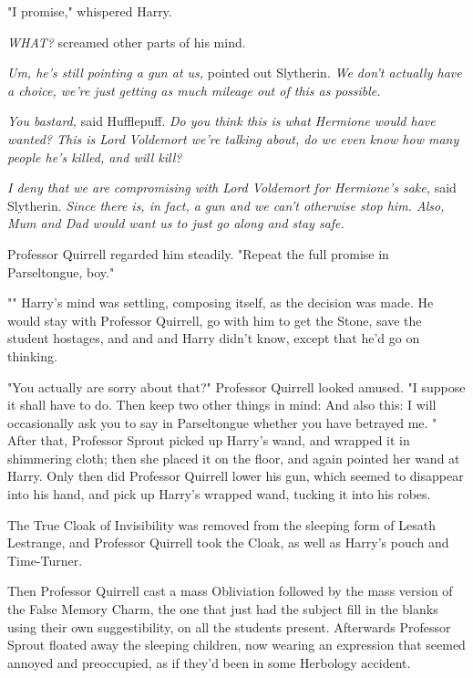 "I promise," whispered Harry.

\emph{WHAT?} screamed other parts of his mind.

\emph{Um, he's still pointing a gun at us,} pointed out Slytherin. \emph{We
don't actually have a choice, we're just getting as much mileage out of this as
possible.}

\emph{You bastard,} said Hufflepuff. \emph{Do you think this is what Hermione
would have wanted? This is Lord Voldemort we're talking about, do we even know
how many people he's killed, and will kill?}

\emph{I deny that we are compromising with Lord Voldemort for Hermione's sake,}
said Slytherin. \emph{Since there is, in fact, a gun and we can't otherwise
stop him. Also, Mum and Dad would want us to just go along and stay safe.}

Professor Quirrell regarded him steadily. "Repeat the full promise in
Parseltongue, boy."

"" Harry's mind was settling, composing
itself, as the decision was made. He would stay with Professor Quirrell, go
with him to get the Stone, save the student hostages, and{\el} and{\el}
and Harry didn't know, except that he'd go on thinking.

"You actually are sorry about that?" Professor Quirrell looked amused. "I
suppose it shall have to do. Then keep two other things in mind:  And also this: I
will occasionally ask you to say in Parseltongue whether you have betrayed me.
"
\sbreak
After that, Professor Sprout picked up Harry's wand, and wrapped it in
shimmering cloth; then she placed it on the floor, and again pointed her wand
at Harry. Only then did Professor Quirrell lower his gun, which seemed to
disappear into his hand, and pick up Harry's wrapped wand, tucking it into his
robes.

The True Cloak of Invisibility was removed from the sleeping form of Lesath
Lestrange, and Professor Quirrell took the Cloak, as well as Harry's pouch and
Time-Turner.

Then Professor Quirrell cast a mass Obliviation followed by the mass version of
the False Memory Charm, the one that just had the subject fill in the blanks
using their own suggestibility, on all the students present. Afterwards
Professor Sprout floated away the sleeping children, now wearing an expression
that seemed annoyed and preoccupied, as if they'd been in some Herbology
accident.

